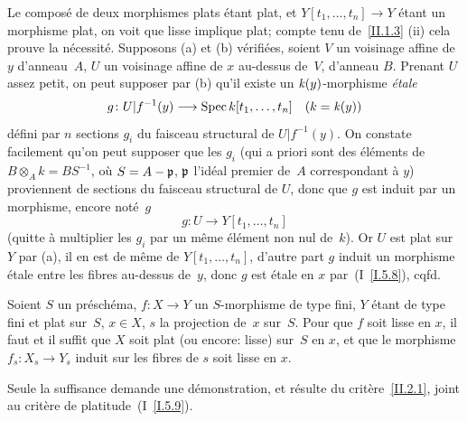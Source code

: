 Le compos\'e de deux morphismes plats \'etant plat, et
$Y[t_{1},\dots,t_{n}]\to Y$ \'etant un morphisme plat, on voit que
lisse implique plat; compte tenu de~\ref{II.1.3} (ii) cela prouve la
n\'ecessit\'e. Supposons (a) et (b) v\'erifi\'ees, soient $V$
un voisinage affine de~$y$ d'anneau~$A$, $U$ un voisinage affine de
$x$ au-dessus de~$V$, d'anneau $B$. Prenant $U$ assez petit, on peut
supposer par (b) qu'il existe un $\mathit{k}(y)$-morphisme \emph{étale}
$$
g\colon U|f^{-1}(y)\to\Spec k[t_{1},\dots,t_{n}]\quad (k=\kres(y))
$$
d\'efini par $n$ sections $g_{i}$ du faisceau structural de
$U|f^{-1}(y)$. On constate facilement qu'on peut supposer que les
$g_{i}$ (qui a priori sont des \'el\'ements de
$B\otimes_{A}k=BS^{-1}$, o\`u $S=A-\mathfrak{p}$, $\mathfrak{p}$ l'id\'eal
premier de~$A$ correspondant \`a $y$) proviennent de sections du
faisceau structural de
$U$,
donc que $g$ est induit par un morphisme,
encore not\'e~$g$
$$
g\colon U\to Y[t_{1},\dots,t_{n}]
$$
(quitte \`a multiplier les $g_{i}$ par un m\^eme \'el\'ement
non nul de~$k$). Or
$U$
est plat sur~$Y$ par (a), il en est de m\^eme de
$Y[t_{1},\dots,t_{n}]$, d'autre part $g$ induit un morphisme
\'etale entre les fibres au-dessus de~$y$, donc $g$ est \'etale en
$x$ par~(I~\ref{I.5.8}), cqfd.

\begin{corollaire}
\label{II.2.2}
Soient $S$ un pr\'esch\'ema, $f\colon X\to Y$ un $S$-morphisme de
type fini, $Y$ \'etant de type fini et plat sur~$S$, $x\in X$, $s$
la projection de~$x$ sur~$S$. Pour que $f$ soit lisse en $x$, il faut
et il suffit que $X$ soit plat (ou encore: lisse) sur~$S$ en $x$, et
que le morphisme $f_{s}\colon X_{s}\to Y_{s}$ induit sur les fibres de
$s$ soit lisse en $x$.
\end{corollaire}

Seule la suffisance demande une d\'emonstration, et r\'esulte du
crit\`ere~\ref{II.2.1}, joint au crit\`ere de
platitude~(I~\ref{I.5.9}).

